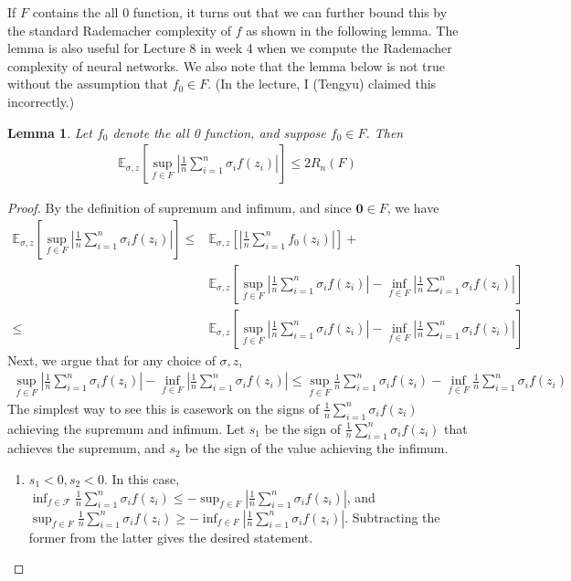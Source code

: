 \documentclass[11pt]{article}
\newcommand{\exu}[2]{\mathbb{E}_{#1}\left[{#2}\right]}
\newtheorem{lemma}{Lemma}
\begin{document}
If $F$ contains the all 0 function, it turns out that we can further bound this by the standard Rademacher complexity of $f$ as shown in the following lemma. The lemma is also useful for Lecture 8 in week 4 when we compute the Rademacher complexity of neural networks. We also note that the lemma below is not true without the assumption that $f_0\in F$. (In the lecture, I (Tengyu) claimed this incorrectly.)
\begin{lemma}
	Let $f_0$ denote the all 0 function, and suppose $f_0 \in F$. Then
	\begin{align*}
		\exu{\sigma,z}{\sup_{f\in F}\left| \frac{1}{n}\sum_{i=1}^n\sigma_if(z_i)\right|} \le 2R_n(F)
	\end{align*}
\end{lemma}
\begin{proof}
	By the definition of supremum and infimum, and since $\bm{0} \in F$, we have 
	\begin{align*}
		\exu{\sigma,z}{\sup_{f\in F}\left| \frac{1}{n}\sum_{i=1}^n\sigma_if(z_i)\right|} \le & \exu{\sigma,z}{\left| \frac{1}{n}\sum_{i=1}^nf_0(z_i)\right|} +\\ & \exu{\sigma,z}{\sup_{f\in F}\left| \frac{1}{n}\sum_{i=1}^n\sigma_if(z_i)\right| - \inf_{f\in F}\left| \frac{1}{n}\sum_{i=1}^n\sigma_if(z_i)\right|} \\
		\le &  \exu{\sigma,z}{\sup_{f\in F}\left| \frac{1}{n}\sum_{i=1}^n\sigma_if(z_i)\right| - \inf_{f\in F}\left| \frac{1}{n}\sum_{i=1}^n\sigma_if(z_i)\right|}
	\end{align*}
	Next, we argue that for any choice of $\sigma, z$, 
	\begin{align*}
		\sup_{f\in F}\left| \frac{1}{n}\sum_{i=1}^n\sigma_if(z_i)\right| - \inf_{f\in F}\left| \frac{1}{n}\sum_{i=1}^n\sigma_if(z_i)\right| \le \sup_{f\in F} \frac{1}{n}\sum_{i=1}^n\sigma_if(z_i) - \inf_{f\in F}\frac{1}{n}\sum_{i=1}^n\sigma_if(z_i)
	\end{align*}
	The simplest way to see this is casework on the signs of $\frac{1}{n}\sum_{i = 1}^n \sigma_i f(z_i)$ achieving the supremum and infimum. Let $s_1$ be the sign of $\frac{1}{n}\sum_{i = 1}^n \sigma_i f(z_i)$ that achieves the supremum, and $s_2$ be the sign of the value achieving the infimum. 
	\begin{enumerate}
		\item $s_1 < 0, s_2 < 0$. In this case, $\inf_{f \in \mathcal{F}} \frac{1}{n} \sum_{i = 1}^n \sigma_i f(z_i) \le -\sup_{f\in F}\left| \frac{1}{n}\sum_{i=1}^n\sigma_if(z_i)\right|$, and $ \sup_{f\in F} \frac{1}{n}\sum_{i=1}^n\sigma_if(z_i) \ge -\inf_{f\in F}\left| \frac{1}{n}\sum_{i=1}^n\sigma_if(z_i)\right|$. Subtracting the former from the latter gives the desired statement. 

\end{enumerate}
\end{proof}
\end{document}
